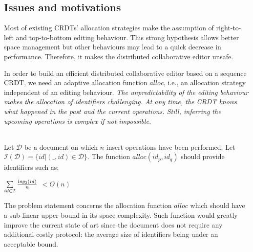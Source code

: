 \subsection{Issues and motivations}
Most of existing CRDTs' allocation strategies make the assumption of
right-to-left and top-to-bottom editing behaviour. This strong hypothesis
allows better space management but other behaviours may lead to a quick
decrease in performance. Therefore, it makes the distributed collaborative
editor unsafe.

In order to build an efficient distributed collaborative editor based on a
sequence CRDT, we need an adaptive allocation function $alloc$, i.e., an
allocation strategy independent of an editing behaviour. \emph{The
  unpredictability of the editing behaviour makes the allocation of identifiers
  challenging. At any time, the CRDT knows what happened in the past and the
  current operations. Still, inferring the upcoming operations is complex if
  not impossible.}

\begin{Def}\ \\
Let $\mathcal{D}$ be a document on which $n$ insert operations have been
performed.  Let $\mathcal{I}(\mathcal{D})= \{id |
(\_,id)\in{\mathcal{D}}\}$. The function $alloc(id_p,id_q)$ should provide
identifiers such as:
\begin{center}
$\sum\limits_{id \in \mathcal{I}} { {log_2(id)}\over{n}}$ $< O(n)$
\end{center}
\end{Def}

The problem statement concerns the allocation function $alloc$ which should
have a sub-linear upper-bound in its space complexity. Such function would
greatly improve the current state of art since the document does not require
any additional costly protocol: the average size of identifiers being under an
acceptable bound.

